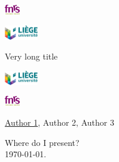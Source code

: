 
\begin{frame}

\vspace{10pt}

\begin{mybox}
\begin{center}
\parbox{.06\textwidth}{\includegraphics[height=12pt]{logos/FNRS.eps}}
\parbox{.13\textwidth}{\includegraphics[height=18pt]{logos/uLIEGE.eps}}
\parbox{.54\textwidth}{\centering \scriptsize Very long title}
\parbox{.13\textwidth}{\includegraphics[height=18pt]{logos/uLIEGE.eps}}
\parbox{.06\textwidth}{\includegraphics[height=12pt]{logos/FNRS.eps}}
{ \tiny \underline{Author 1}, Author 2, Author 3}
\end{center}
\end{mybox}

\vspace{-10pt}
\begin{center}
\end{center}

\begin{center}
Where do I present?\\
\today.
\end{center}
\end{frame}